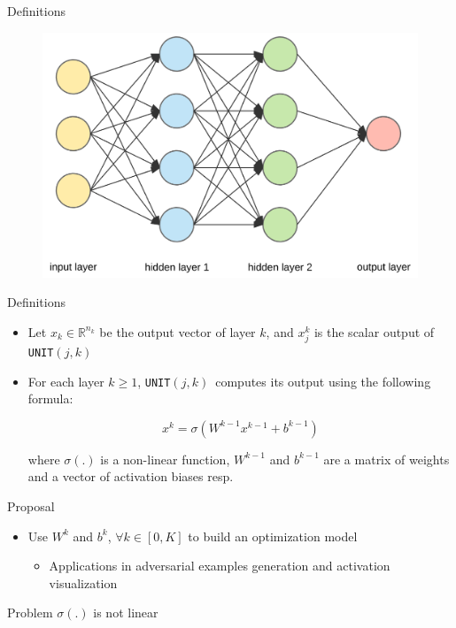 \documentclass{beamer}
\newcommand{\UNIT}{\texttt{UNIT}$(j,k)$}
\begin{document}
\begin{frame}{Definitions}
  \begin{figure}
      \centering
      \includegraphics[width=\columnwidth]{dnn.png}
  \end{figure}
\end{frame}

\begin{frame}{Definitions}
  \begin{itemize}
  \item Let $x_k \in \mathbb{R}^{n_k}$ be the output vector of layer $k$, and $x_j^k$ is the scalar output of \UNIT
  \item For each layer $k \geq 1$, \UNIT \  computes its output using the following formula:

  $$
  x^k = \sigma(W^{k-1} x^{k-1} + b^{k-1})
  $$

  where $\sigma(.)$ is a non-linear function, $W^{k-1}$ and $b^{k-1}$ are a matrix of weights and a vector of activation biases resp.
  \end{itemize}
\end{frame}

\begin{frame}{Proposal}
  \begin{itemize}
  \item Use $W^k$ and $b^k$, $\forall k \in [0, K]$ to build an optimization model
    \begin{itemize}
    \item Applications in adversarial examples generation and activation visualization
    \end{itemize}
  \end{itemize}
  \pause
  \begin{block}{Problem}
    \centering
    $\sigma(.)$ is not linear
  \end{block}
\end{frame}
\end{document}
